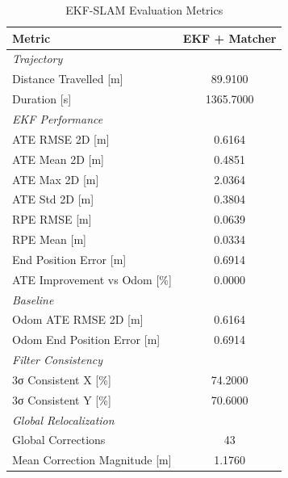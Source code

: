 \begin{table}[htbp]
\centering
\caption{EKF-SLAM Evaluation Metrics}
\label{tab:ekf_results}
\begin{tabular}{lc}
\toprule
Metric & \textbf{EKF + Matcher} \\
\midrule
\multicolumn{2}{l}{\textit{Trajectory}} \\
Distance Travelled [m] & 89.9100 \\
Duration [s] & 1365.7000 \\
\midrule
\multicolumn{2}{l}{\textit{EKF Performance}} \\
ATE RMSE 2D [m] & 0.6164 \\
ATE Mean 2D [m] & 0.4851 \\
ATE Max 2D [m] & 2.0364 \\
ATE Std 2D [m] & 0.3804 \\
RPE RMSE [m] & 0.0639 \\
RPE Mean [m] & 0.0334 \\
End Position Error [m] & 0.6914 \\
ATE Improvement vs Odom [\%] & 0.0000 \\
\midrule
\multicolumn{2}{l}{\textit{Baseline}} \\
Odom ATE RMSE 2D [m] & 0.6164 \\
Odom End Position Error [m] & 0.6914 \\
\midrule
\multicolumn{2}{l}{\textit{Filter Consistency}} \\
3σ Consistent X [\%] & 74.2000 \\
3σ Consistent Y [\%] & 70.6000 \\
\midrule
\multicolumn{2}{l}{\textit{Global Relocalization}} \\
Global Corrections & 43 \\
Mean Correction Magnitude [m] & 1.1760 \\
\midrule
\bottomrule
\end{tabular}
\end{table}